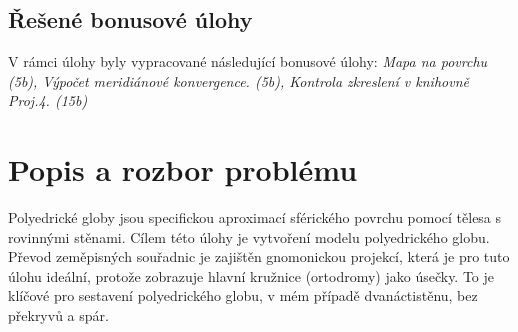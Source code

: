 \documentclass[12pt, a4paper]{article}
\begin{document}
\begin{center}
\end{center}
\vspace{5mm}

\subsection*{Řešené bonusové úlohy}
V rámci úlohy byly vypracované následující bonusové úlohy: \textit {Mapa na povrchu (5b), Výpočet meridiánové konvergence. (5b), Kontrola zkreslení v knihovně \textit{Proj.4.} (15b)}

\newpage
\section{Popis a rozbor problému}
\vspace{5mm}
Polyedrické globy jsou specifickou aproximací sférického povrchu pomocí tělesa s rovinnými stěnami. Cílem této úlohy je vytvoření modelu polyedrického globu. Převod zeměpisných souřadnic je zajištěn gnomonickou projekcí, která je pro tuto úlohu ideální, protože zobrazuje hlavní kružnice (ortodromy) jako úsečky. To je klíčové pro sestavení polyedrického globu, v mém případě dvanáctistěnu, bez překryvů a spár.
\vspace{3mm}
\end{document}
